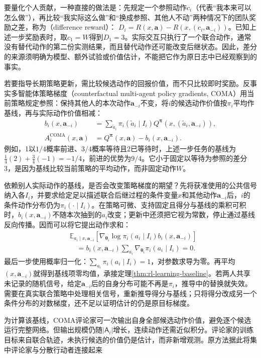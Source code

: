 要量化个人贡献，一种直接的做法是：先规定一个参照动作$c_i$（代表“我本来可以怎么做”），再比较“我实际这么做”和“换成参照、其他人不动”两种情况下的团队奖励之差，称为（difference reward）：
$D_i=R(x,\bm a)-R(x,(c_i,\bm a_{-i}))$。已知上述一步奖励表时，取$c_1=W$得到$D_1=3$。实际交互只执行了一个联合动作，通常没有替代动作的第二份实测结果，而且替代动作还可能改变后继状态。因此，差分的来源须明确为模型、额外试验或价值估计，不能把它作为原日志中已经观察到的事实。

若要指导长期策略更新，需比较候选动作的回报价值，而不只比较即时奖励。反事实多智能体策略梯度（counterfactual multi-agent policy gradients, COMA）用当前策略规定参照：保持其他人的本次动作$\bm a_{-i}$不变，将$i$的候选动作价值按$\pi_i$平均作基线，再与实际动作价值相减：
\begin{align}
 b_i(x,\bm a_{-i})
 &=\sum_{\tilde a_i}\pi_i(\tilde a_i\mid I_i)
       Q^{\bm\pi}(x,(\tilde a_i,\bm a_{-i})),\\
 A_i^{\text{COMA}}(x,\bm a)
 &=Q^{\bm\pi}(x,\bm a)-b_i(x,\bm a_{-i}).
 \label{eq:rl-multi-agent-coma}
\end{align}
例如，1以$1/4$概率前进、$3/4$概率等待且2已等待时，上述一步任务的基线为
$\tfrac14(2)+\tfrac34(-1)=-1/4$，前进的优势为$9/4$。它小于固定以等待为参照的差分3，是因为基线比较当前策略的平均动作，而非固定动作$W$。

依赖别人实际动作的基线，是否会改变策略梯度的期望？先将获准使用的公共信号纳入各$I_i$，并要求给定足以描述联合后继过程的条件变量$x$和其他动作$\bm a_{-i}$后，$i$的条件动作分布仍为$\pi_i(\cdot\mid I_i)$。在策略可微、支持固定且得分与基线的乘积可积时，$b_i(x,\bm a_{-i})$不随本次抽到的$a_i$改变；更新中还须把它视为常数，停止通过基线反向传播。因而可以将它提出动作求和：
\begin{align}
 &\mathbb E_{a_i\mid x,\bm a_{-i}}
   [\nabla_{\bm\theta_i}\log\pi_i(a_i\mid I_i)b_i(x,\bm a_{-i})]\nonumber\\
 &\quad=b_i(x,\bm a_{-i})
       \sum_{a_i}\nabla_{\bm\theta_i}\pi_i(a_i\mid I_i)=0.
 \label{eq:rl-multi-agent-baseline-zero}
\end{align}
最后一步使用概率归一化：$\sum_{a_i}\pi_i(a_i\mid I_i)=1$，对参数求导为零。再平均$(x,\bm a_{-i})$就得到基线项零均值，承接定理\ref{thm:rl-learning-baseline}。若两人共享未记录的随机信号，给定$\bm a_{-i}$后的自身分布可能不再是$\pi_i$，推导中的替换就失效。需要在真实联合策略中处理相关信号，重新推导得分与基线；只将得分改成另一个条件分布的对数梯度，还不足以证明估计的仍是原目标梯度。

为计算该基线，COMA评论家可一次输出自身全部候选动作价值，避免逐个候选运行完整网络。但输出规模仍随$|\mathsf A_i|$增长，连续动作还需近似积分。评论家的训练目标来自联合轨迹，未执行候选的价值仍是估计，而非新增观测。原方法据此将集中评论家与分散行动者连接起来

